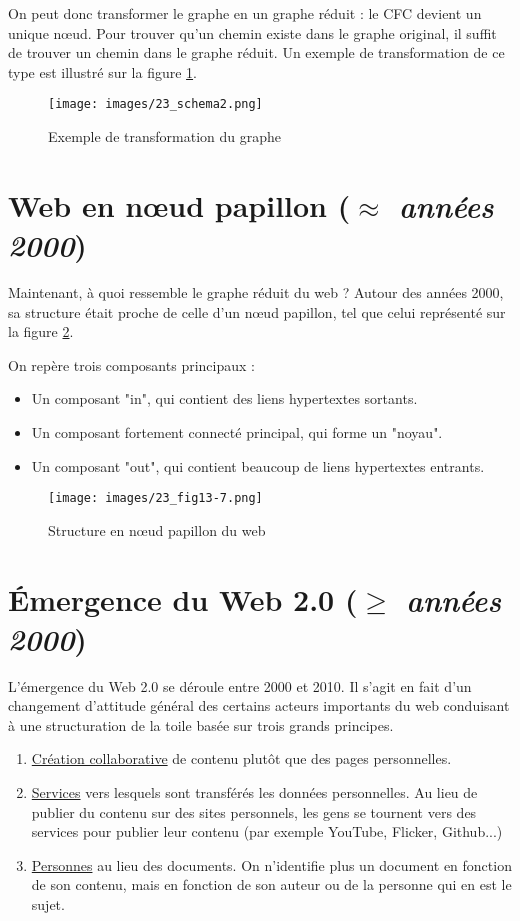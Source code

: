 \vspace{0.3cm}

On peut donc transformer le graphe en un graphe réduit : le CFC devient un unique nœud. Pour trouver qu'un chemin existe dans le graphe original, il suffit de trouver un chemin dans le graphe réduit.
Un exemple de transformation de ce type est illustré sur la figure \ref{cfc_transformation}.
\vspace{0.3cm}

\begin{figure}[!ht]
\centering
\texttt{[image: images/23\_schema2.png]}
\caption{Exemple de transformation du graphe}
\label{cfc_transformation}
\end{figure}


\section{Web en nœud papillon (\textit{$\approx$ années 2000})}
	Maintenant, à quoi ressemble le graphe réduit du web ? Autour des années 2000, sa structure était proche de celle d'un nœud papillon, tel que celui représenté sur la figure \ref{noeud_papillon}.
	
	On repère trois composants principaux :
	\begin{itemize}
	\item Un composant "in", qui contient des liens hypertextes sortants.
	\item Un composant fortement connecté principal, qui forme un "noyau".
	\item Un composant "out", qui contient beaucoup de liens hypertextes entrants.
	\end{itemize}
	
	\begin{figure}[!ht]
		\centering
		\texttt{[image: images/23\_fig13-7.png]}
		\caption{Structure en nœud papillon du web}
		\label{noeud_papillon}
	\end{figure}

\section{Émergence du Web 2.0 (\textit{$\ge$ années 2000})}
L'émergence du Web 2.0 se déroule entre 2000 et 2010. Il s'agit en fait d'un changement d'attitude général des certains acteurs importants du web conduisant à une structuration de la toile basée sur trois grands principes. 
\begin{enumerate}
    \item \underline{Création collaborative} de contenu plutôt que des pages personnelles.
    \item \underline{Services} vers lesquels sont transférés les données personnelles. Au lieu de publier du contenu  sur des sites personnels, les gens se tournent vers des services pour publier leur contenu (par exemple YouTube, Flicker, Github...)
    \item \underline{Personnes} au lieu des documents. On n'identifie plus un document en fonction de son contenu, mais en fonction de son auteur ou de la personne qui en est le sujet.
\end{enumerate} 

